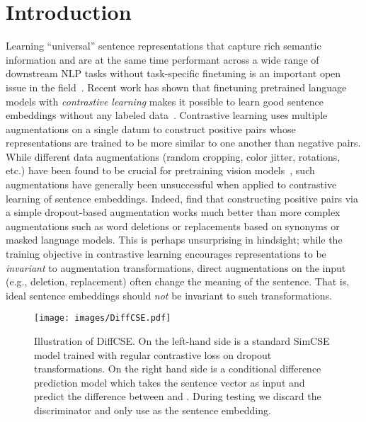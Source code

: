 \documentclass[11pt]{article}
\begin{document}
\section{Introduction}
\vspace{-1mm}
Learning ``universal'' sentence representations that capture rich semantic information and are at the same time performant across a wide range of downstream NLP tasks without task-specific finetuning is an important open issue in the field~\cite{conneau2017supervised, cer2018universal, kiros2015skip-thought, logeswaran2018an-quick-thought, giorgi2020declutr, yan2021consert, gao2021simcse}. Recent work has shown that finetuning pretrained language models with  \emph{contrastive learning} makes it possible to learn good sentence embeddings without  any labeled data~\cite{giorgi2020declutr, yan2021consert, gao2021simcse}. Contrastive learning uses multiple augmentations on a single datum to construct positive pairs whose representations are trained to be more similar to one another than negative pairs. While different data augmentations (random cropping, color jitter, rotations, etc.) have been found to be crucial for pretraining vision models~\cite{chen2020simple}, such augmentations have generally been unsuccessful when applied to contrastive learning of sentence embeddings. Indeed,  \citet{gao2021simcse} find that constructing positive pairs via a simple dropout-based augmentation works much better than more complex augmentations such as word deletions or replacements based on synonyms or masked language models. This is perhaps unsurprising in hindsight; while the training objective in contrastive learning encourages representations to be \emph{invariant} to augmentation transformations, direct augmentations on the input (e.g., deletion, replacement) often change the meaning of the sentence. That is, ideal sentence embeddings should \emph{not} be invariant to such transformations.


\begin{figure*}[!h]
    \centering
        \vspace{-2mm}
    \texttt{[image: images/DiffCSE.pdf]}
    \caption{Illustration of DiffCSE. On the left-hand side is a standard SimCSE model trained with regular contrastive loss on dropout transformations. On the right hand side is a conditional difference prediction model which takes the sentence vector  as input and predict the difference between  and . During testing we discard the discriminator and only use  as the sentence embedding.}
    \label{fig:diffcse}
    \vspace{-2mm}
\end{figure*}
\end{document}
